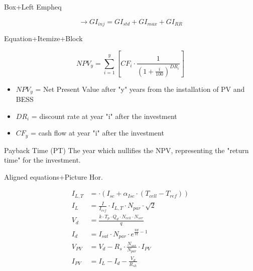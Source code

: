 \documentclass[xcolor=dvipsnames,aspectratio=169]{beamer} %
\begin{document}
{{\begin{frame}[noframenumbering]{Box+Left Empheq}
\begin{minipage}[t]{0.3\paperwidth}
    \vspace{51pt}
    \begin{equation*}
    \longrightarrow GI_{inj}=GI_{std}+GI_{max}+GI_{RR} 
    \end{equation*}

\end{minipage}

\end{frame}

\begin{frame}[noframenumbering]{Equation+Itemize+Block}

\begin{minipage}{0.9\paperwidth}

    \vspace{-32pt}
    \begin{equation*}
    NPV_y = \sum_{i=1}^{y} \left[ CF_i \cdot \frac{1}{\left(1+\frac{i}{100} \right)^{DR_i}} \right]
    \end{equation*}
    \begin{itemize}
        \item $NPV_y$ = Net Present Value after "y" years from the installation of PV and BESS
        \item $DR_i$ = discount rate at year "i" after the investment
        \item $CF_y$ = cash flow at year "i" after the investment
    \end{itemize}
    \begin{block}{Payback Time (PT)}
    The year which nullifies the NPV, representing the "return time" for the investment.
    \end{block}
    
\end{minipage}

\end{frame}

\begin{frame}[noframenumbering]{Aligned equations+Picture Hor.}

\vspace{-12pt}

\begin{minipage}{0.4\paperwidth}

\begin{align*}
    I_{L,T} &= \cdot (I_{sc}+\alpha_{Isc} \cdot (T_{cell}-T_{ref})) \\
    I_L &= \frac{I}{I_{ref}} \cdot I_{L,T} \cdot N_{par} \cdot \sqrt{2} \\
    V_d &= \frac{k \cdot T_p \cdot Q_d \cdot N_{cell} \cdot N_{ser}}{q} \\
    I_d &= I_{sat} \cdot N_{par} \cdot e^{\frac{Vd}{Vt}-1} \\
    V_{PV} &= V_d-R_s \cdot \frac{N_{ser}}{N_{par}} \cdot I_{PV} \\
    I_{PV} &= I_L-I_d-\frac{V_d}{R_{sh}}
\end{align*}


\end{minipage}
\end{frame}}}
\end{document}
